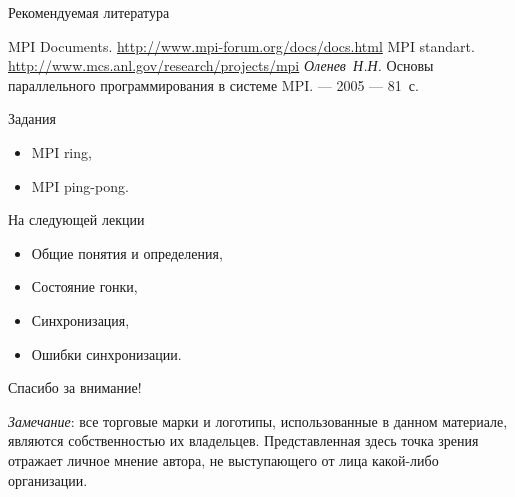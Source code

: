 \begin{frame}[allowframebreaks]{Рекомендуемая литература}
\begin{thebibliography}{99}
    \bibitem{} MPI Documents. \url{http://www.mpi-forum.org/docs/docs.html}
    \bibitem{} MPI standart. \url{http://www.mcs.anl.gov/research/projects/mpi}
    \bibitem{} \textit{Оленев~Н.Н.} Основы параллельного программирования в
    системе MPI. --- 2005 --- 81~с.
\end{thebibliography}
\end{frame}

\begin{frame}{Задания}
\begin{itemize}
    \item MPI ring,
    \item MPI ping-pong.
\end{itemize}
\end{frame}

\begin{frame}{На следующей лекции}
\begin{itemize}
    \item Общие понятия и определения,
    \item Состояние гонки,
    \item Синхронизация,
    \item Ошибки синхронизации.
\end{itemize}
\end{frame}

\begin{frame}

{\huge{Спасибо за внимание!}\par}

\vfill

\tiny{\textit{Замечание}: все торговые марки и логотипы, использованные в данном материале, являются собственностью их владельцев. Представленная здесь точка зрения отражает личное мнение автора, не выступающего от лица какой-либо организации.}

\end{frame}


